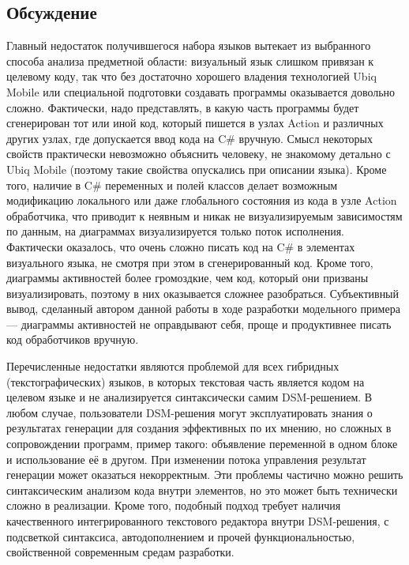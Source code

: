 \subsection{Обсуждение}
Главный недостаток получившегося набора языков вытекает из выбранного способа анализа 
предметной области: визуальный язык слишком привязан к целевому коду, так что без 
достаточно хорошего владения технологией Ubiq Mobile или специальной подготовки создавать 
программы оказывается довольно сложно. Фактически, надо представлять, в какую часть программы 
будет сгенерирован тот или иной код, который пишется в узлах Action и различных других 
узлах, где допускается ввод кода на C\# вручную. Смысл некоторых свойств практически 
невозможно объяснить человеку, не знакомому детально с Ubiq Mobile (поэтому такие 
свойства опускались при описании языка). Кроме того, наличие в C\# переменных и полей 
классов делает возможным модификацию локального или даже глобального состояния из 
кода в узле Action обработчика, что приводит к неявным и никак не визуализируемым 
зависимостям по данным, на диаграммах визуализируется только поток исполнения. Фактически 
оказалось, что очень сложно писать код на C\# в элементах визуального языка, не смотря 
при этом в сгенерированный код. Кроме того, диаграммы активностей более громоздкие, 
чем код, который они призваны визуализировать, поэтому в них оказывается сложнее 
разобраться. Субъективный вывод, сделанный автором данной работы в ходе разработки 
модельного примера --- диаграммы активностей не оправдывают себя, проще и продуктивнее 
писать код обработчиков вручную.

Перечисленные недостатки являются проблемой для всех гибридных (текстографических) 
языков, в которых текстовая часть является кодом на целевом языке и не анализируется 
синтаксически самим \ac{DSM}-решением. В любом случае, пользователи \ac{DSM}-решения могут эксплуатировать 
знания о результатах генерации для создания эффективных по их мнению, но сложных в 
сопровождении программ, пример такого: объявление переменной в одном блоке и использование 
её в другом. При изменении потока управления результат генерации может оказаться некорректным. 
Эти проблемы частично можно решить синтаксическим анализом кода внутри элементов, 
но это может быть технически сложно в реализации. Кроме того, подобный подход требует 
наличия качественного интегрированного текстового редактора внутри \ac{DSM}-решения, с 
подсветкой синтаксиса, автодополнением и прочей функциональностью, свойственной современным 
средам разработки.

